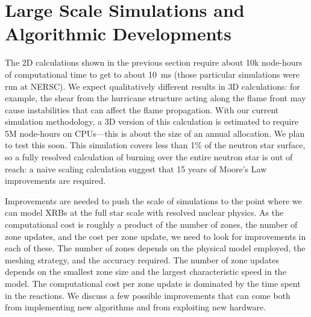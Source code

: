 \documentclass[a4paper]{jpconf}
\newcommand{\MarginPar}[1]{\marginpar{\vskip-\baselineskip\raggedright\tiny\sffamily\hrule\smallskip{\color{red}#1}\par\smallskip\hrule}}
\begin{document}
\section{Large Scale Simulations and Algorithmic Developments}

The 2D calculations shown in the previous section require about 10k
node-hours of computational time to get to about 10~ms (those
particular simulations were run at NERSC).  We expect qualitatively different
results in 3D calculations: for example, the shear from the hurricane structure
acting along the flame front may cause instabilities that can affect the flame
propagation.
With our current simulation methodology,
a 3D version of this calculation is estimated to require 5M node-hours
on CPUs---this is about the size of an annual \MarginPar{double check
  \#s} allocation.
We plan to test this soon.
This simulation covers less than
1\% of the neutron star surface, so a fully resolved calculation of
burning over the entire neutron star is out of reach: a naive scaling
calculation suggest that 15 years of Moore's Law improvements are required.
%
%

Improvements are needed to push the scale of simulations
to the point where we can model XRBs at the full star scale with
resolved nuclear physics.
As the computational cost is roughly a product of the number of zones, the
number of zone updates, and the cost per zone update, we need to look for
improvements in each of these. The number of zones depends on the physical
model employed, the meshing strategy, and the accuracy required. The number of
zone updates depends on the smallest zone size and the largest characteristic
speed in the model. The computational cost per zone update is dominated by the
time spent in the reactions\MarginPar{verify fraction}. We discuss a few
possible improvements that can come both from implementing new algorithms and
from exploiting new hardware.


\end{document}
